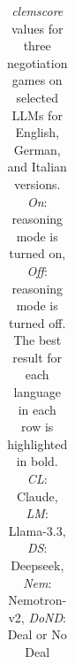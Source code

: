 \begin{table}[ht]
\begin{tabular}{c|l|cc|cc|cc|cc|cc|cc|c|c}
\end{tabular}
\caption{\textit{clemscore} values for three negotiation games on selected LLMs for English, German, and Italian versions. \textit{On}: reasoning mode is turned on, \textit{Off}: reasoning mode is turned off. The best result for each language in each row is highlighted in bold. \textit{CL}: Claude, \textit{LM}: Llama-3.3, \textit{DS}: Deepseek, \textit{Nem}: Nemotron-v2, \textit{DoND}: Deal or No Deal }
\label{tab:main-results}
\end{table}


